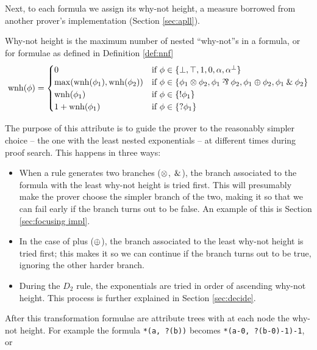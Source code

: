 Next, to each formula we assign its why-not height, a measure borrowed from another prover's implementation (Section \ref{sec:apll}).
\begin{define}
	\label{def:why-not height}
	Why-not height is the maximum number of nested ``why-not''s in a formula, or for formulae as defined in Definition \ref{def:nnf}
	$$ \mathrm{wnh}(\phi) = 
	\begin{cases}	
		0 & \text{if }\phi \in \{\llbot, \lltop, \llone, \llzero, \alpha, \llnot{\alpha} \} \\
		\max(\mathrm{wnh}(\phi_1), \mathrm{wnh}(\phi_2)) & \text{if } \phi \in \{ \phi_1 \llten \phi_2, \phi_1 \llpar \phi_2, \phi_1 \llplus \phi_2, \phi_1 \llwith \phi_2 \} \\
		\mathrm{wnh}(\phi_1) & \text{if }\phi \in \{ \llbang{\phi_1}\} \\
		1 + \mathrm{wnh}(\phi_1) & \text{if }\phi \in \{ \llwn{\phi_1} \} 
	\end{cases}
	$$
\end{define}
The purpose of this attribute is to guide the prover to the reasonably simpler choice -- the one with the least nested exponentials -- at different times during proof search.
This happens in three ways: 
\begin{itemize}
	\item When a rule generates two branches ($\otimes$, $\!\:\&\:\!$), the branch associated to the formula with the least why-not height is tried first.
		This will presumably make the prover choose the simpler branch of the two, making it so that we can fail early if the branch turns out to be false.
		An example of this is Section \ref{sec:focusing impl}.
	\item In the case of plus ($\oplus$), the branch associated to the least why-not height is tried first; this makes it so we can continue if the branch turns out to be true, ignoring the other harder branch.
	\item During the $D_2$ rule, the exponentials are tried in order of ascending why-not height.
		This process is further explained in Section \ref{sec:decide}.
\end{itemize}
After this transformation formulae are attribute trees with at each node the why-not height.
For example the formula \texttt{*(a, ?(b))} becomes \texttt{*(a-0, ?(b-0)-1)-1}, or
\begin{figure}[H]
	\centering
\end{figure}

